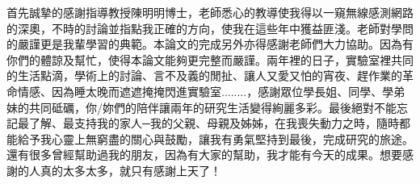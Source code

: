 
首先誠摯的感謝指導教授陳明明博士，老師悉心的教導使我得以一窺無線感測網路的深奧，不時的討論並指點我正確的方向，使我在這些年中獲益匪淺。老師對學問的嚴謹更是我輩學習的典範。本論文的完成另外亦得感謝老師們大力協助。因為有你們的體諒及幫忙，使得本論文能夠更完整而嚴謹。兩年裡的日子，實驗室裡共同的生活點滴，學術上的討論、言不及義的閒扯、讓人又愛又怕的宵夜、趕作業的革命情感、因為睡太晚而遮遮掩掩閃進實驗室........，感謝眾位學長姐、同學、學弟妹的共同砥礪，你/妳們的陪伴讓兩年的研究生活變得絢麗多彩。最後絕對不能忘記最了解、最支持我的家人─我的父親、母親及姊姊，在我喪失動力之時，隨時都能給予我心靈上無窮盡的關心與鼓勵，讓我有勇氣堅持到最後，完成研究的旅途。還有很多曾經幫助過我的朋友，因為有大家的幫助，我才能有今天的成果。想要感謝的人真的太多太多，就只有感謝上天了！
